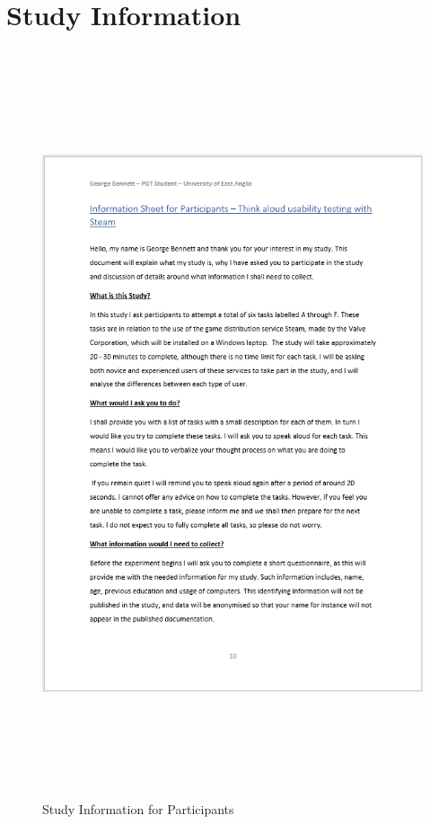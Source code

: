 \section{Study Information}
\begin{figure}[H]
    \includegraphics[width=16cm,height=22cm]{Screenshots/StudyMaterialScreenshots/informationPT1.png}
    \caption{Study Information for Participants}
\end{figure}

